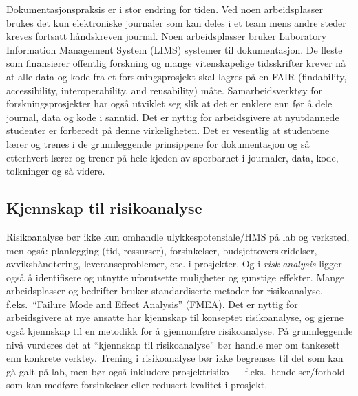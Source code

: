 \documentclass{article}
\begin{document}
Dokumentasjonspraksis er i stor endring for tiden. Ved noen arbeidsplasser brukes det kun elektroniske journaler som kan deles i et team mens andre steder kreves fortsatt håndskreven journal. Noen arbeidsplasser bruker Laboratory Information Management System (LIMS) systemer til dokumentasjon. De fleste som finansierer offentlig forskning og mange vitenskapelige tidsskrifter krever nå at alle data og kode fra et forskningsprosjekt skal lagres på en FAIR (findability, accessibility, interoperability, and reusability) måte. Samarbeidsverktøy for forskningsprosjekter har også utviklet seg slik at det er enklere enn før å dele journal, data og kode i sanntid. Det er nyttig for arbeidsgivere at nyutdannede studenter er forberedt på denne virkeligheten. Det er vesentlig at studentene lærer og trenes i de grunnleggende prinsippene for dokumentasjon og så etterhvert lærer og trener på hele kjeden av sporbarhet i journaler, data, kode, tolkninger og så videre.

\subsection{Kjennskap til risikoanalyse}
Risikoanalyse bør ikke kun omhandle ulykkespotensiale/HMS på lab og verksted, men også: planlegging (tid, ressurser), forsinkelser, budsjettoverskridelser,  avvikshåndtering, leveranseproblemer, etc. i prosjekter. Og i \emph{risk analysis} ligger også å identifisere og utnytte uforutsette muligheter og gunstige effekter. Mange arbeidsplasser og bedrifter bruker standardiserte metoder for risikoanalyse, f.eks.~``Failure Mode and Effect Analysis'' (FMEA). Det er nyttig for arbeidsgivere at nye ansatte har kjennskap til konseptet risikoanalyse, og gjerne også kjennskap til en metodikk for å gjennomføre risikoanalyse. 
På grunnleggende nivå vurderes det at ``kjennskap til risikoanalyse'' bør handle mer om tankesett enn konkrete verktøy.
Trening i risikoanalyse bør ikke begrenses til det som kan gå galt på lab, men bør også inkludere prosjektrisiko --- f.eks.~hendelser/forhold som kan medføre forsinkelser eller redusert kvalitet i prosjekt.
\end{document}
